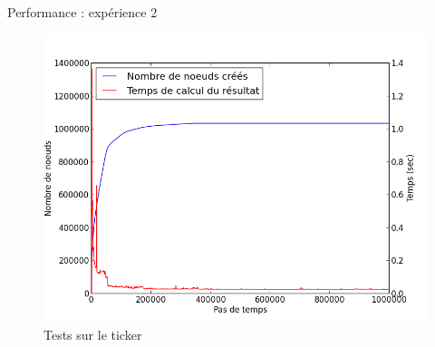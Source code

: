 \documentclass{beamer}
\begin{document}
\begin{frame}{Performance : expérience 2}
  \begin{figure}
    \centering
    \includegraphics[scale=0.4]{perf_ticker.png}
    \caption{Tests sur le ticker}
  \end{figure}
\end{frame}
\end{document}
